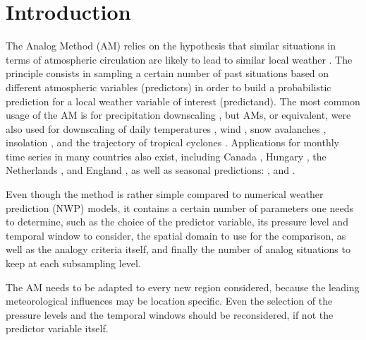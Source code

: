 \documentclass{ametsoc}
\begin{document}


\section{Introduction}
\label{section_intro}

The Analog Method (AM) relies on the hypothesis that similar situations in terms of atmospheric circulation are likely to lead to similar local weather \citep{Lorenz1956, Lorenz1969, Duband1970, Bontron2005}. The principle consists in sampling a certain number of past situations based on different atmospheric variables (predictors) in order to build a probabilistic prediction for a local weather variable of interest (predictand). The most common usage of the AM is for precipitation downscaling \citep[eg.][]{Guilbaud1997, Bontron2005, Bliefernicht2010, Marty2012, Horton2012, Radanovics2013, BenDaoud2015}, but AMs, or equivalent, were also used for downscaling of daily temperatures \citep{Radinovic1975, Woodcock1980, Kruizinga1983}, wind \citep{Gordon1987}, snow avalanches \citep{Obled1980, Bolognesi1993}, insolation \citep{Bois1981}, and the trajectory of tropical cyclones \citep{Keenan1981, Sievers2000, Fraedrich2003}. Applications for monthly time series in many countries also exist, including Canada \citep{Shabbar1986},  Hungary \citep{Toth1989}, the Netherlands \citep{Nap1981}, and England \citep{Murray1974}, as well as seasonal predictions: \citet{Barnett1978}, \citet{Bergen1982} and \citet{Livezey1988}.

Even though the method is rather simple compared to numerical weather prediction (NWP) models, it contains a certain number of parameters one needs to determine, such as the choice of the predictor variable, its pressure level and temporal window to consider, the spatial domain to use for the comparison, as well as the analogy criteria itself, and finally the number of analog situations to keep at each subsampling level. 

The AM needs to be adapted to every new region considered, because the leading meteorological influences may be location specific. Even the selection of the pressure levels and the temporal windows should be reconsidered, if not the predictor variable itself. 
\end{document}
